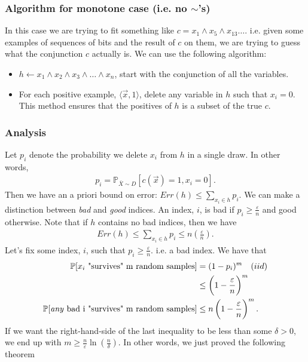 \documentclass[12pt, letterpaper]{article}
\newcommand{\mb}{\mathbb}
\newcommand{\ve}{\varepsilon}
\theoremstyle{definition}
\theoremstyle{remark}
\begin{document}
\subsubsection{Algorithm for monotone case (i.e. no $\sim$'s)}

In this case we are trying to fit something like $c = x_1\wedge x_5 \wedge x_{13} \ldots$. i.e. given some examples of sequences of bits and the result of $c$ on them, we are trying to guess what the conjunction $c$ actually is. We can use the following algorithm:
\begin{itemize}
    \item $h \leftarrow x_1\wedge x_2 \wedge x_3\wedge \ldots \wedge x_n$, start with the conjunction of all the variables.
    \item For each positive example, $\langle \vec x, 1 \rangle$, delete any variable in $h$ such that $x_i=0$.\\
    This method ensures that the positives of $h$ is a subset of the true $c$.
\end{itemize}


\subsubsection*{Analysis}

Let $p_i$ denote the probability we delete $x_i$ from $h$ in a single draw. In other words,
\begin{align}
    p_i = \mb P_{\bar X\sim D}[c(\vec x) = 1, x_i=0].
\end{align}
Then we have an a priori bound on error: $Err(h) \leq \sum\limits_{x_i\in h} p_i$. We can make a distinction between \emph{bad} and \emph{good} indices. An index, $i$, is bad if $p_i\geq \frac{\ve}{n}$ and good otherwise. Note that if $h$ contains no bad indices, then we have
\begin{align}
    Err(h) \leq \sum\limits_{x_i\in h} p_i \leq n\left(\frac{\ve}{n}\right).
\end{align}
Let's fix some index, $i$, such that $p_i\geq \frac\ve n$. i.e. a bad index. We have that
\begin{align}
    \mb P[x_i\textrm{ "survives" m random samples}] &= (1 - p_i)^m \quad (iid)\\
    & \leq \left(1 - \frac\ve n\right)^m \\
    \mb P[\textrm{\emph{any} bad i "survives" m random samples}] &\leq n\left(1 - \frac\ve n\right)^m.
\end{align}
If we want the right-hand-side of the last inequality to be less than some $\delta>0$, we end up with $m \geq \frac n\ve \ln\left(\frac n\delta\right)$. In other words, we just proved the following theorem
\end{document}
